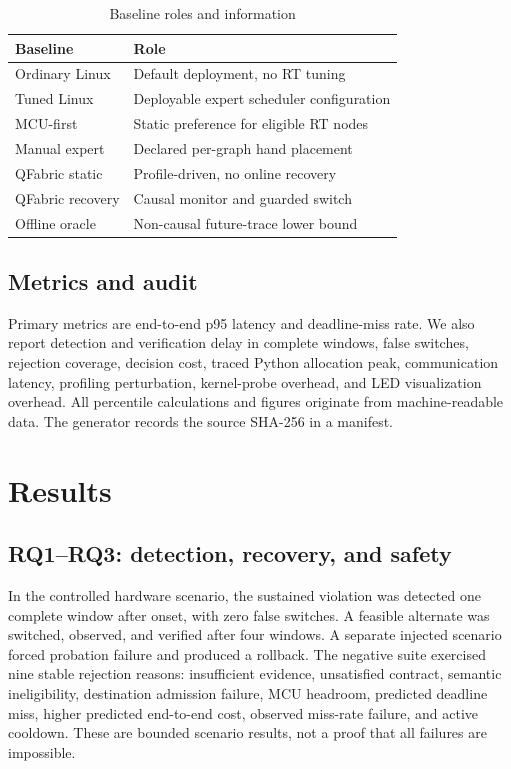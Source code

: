 \documentclass[conference]{IEEEtran}
\newcommand{\system}{QFabric\xspace}
\begin{document}
\begin{table}[t]
\caption{Baseline roles and information}
\label{tab:baselines}
\centering
\small
\begin{tabular}{lp{3.8cm}}
\toprule
Baseline & Role \\
\midrule
Ordinary Linux & Default deployment, no RT tuning \\
Tuned Linux & Deployable expert scheduler configuration \\
MCU-first & Static preference for eligible RT nodes \\
Manual expert & Declared per-graph hand placement \\
\system static & Profile-driven, no online recovery \\
\system recovery & Causal monitor and guarded switch \\
Offline oracle & Non-causal future-trace lower bound \\
\bottomrule
\end{tabular}
\end{table}

\subsection{Metrics and audit}
Primary metrics are end-to-end p95 latency and deadline-miss rate. We also
report detection and verification delay in complete windows, false switches,
rejection coverage, decision cost, traced Python allocation peak,
communication latency, profiling perturbation, kernel-probe overhead, and LED
visualization overhead. All percentile calculations and figures originate from
machine-readable data. The generator records the source SHA-256 in a manifest.

\section{Results}
\subsection{RQ1--RQ3: detection, recovery, and safety}
In the controlled hardware scenario, the sustained violation was detected one
complete window after onset, with zero false switches. A feasible alternate
was switched, observed, and verified after four windows. A separate injected
scenario forced probation failure and produced a rollback. The negative suite
exercised nine stable rejection reasons: insufficient evidence, unsatisfied
contract, semantic ineligibility, destination admission failure, MCU headroom,
predicted deadline miss, higher predicted end-to-end cost, observed miss-rate
failure, and active cooldown. These are bounded scenario results, not a proof
that all failures are impossible.
\end{document}
